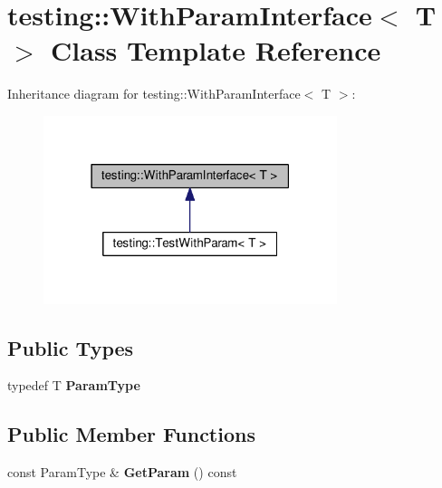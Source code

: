 \hypertarget{classtesting_1_1_with_param_interface}{}\section{testing\+:\+:With\+Param\+Interface$<$ T $>$ Class Template Reference}
\label{classtesting_1_1_with_param_interface}


Inheritance diagram for testing\+:\+:With\+Param\+Interface$<$ T $>$\+:
\nopagebreak
\begin{figure}[H]
\begin{center}
\leavevmode
\includegraphics[width=243pt]{classtesting_1_1_with_param_interface__inherit__graph}
\end{center}
\end{figure}
\subsection*{Public Types}
\begin{DoxyCompactItemize}
\item 
\mbox{\label{classtesting_1_1_with_param_interface_a343febaaebf1f025bda484f841d4fec1}} 
typedef T {\bfseries Param\+Type}
\end{DoxyCompactItemize}
\subsection*{Public Member Functions}
\begin{DoxyCompactItemize}
\item 
\mbox{\label{classtesting_1_1_with_param_interface_aa7b9028f06ee7ec1174bb25317b07eb2}} 
const Param\+Type \& {\bfseries Get\+Param} () const
\end{DoxyCompactItemize}
